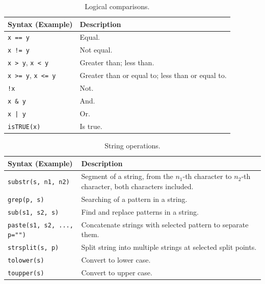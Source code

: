 \begin{table}
  \centering \caption{Logical comparisons.}\label{ch:r1:tab:logicalcomparison}
  \begin{tabularx}{\textwidth}{lX}
    \hline
    Syntax (Example) & Description \\ \hline
    \verb|x == y| & Equal. \\
    \verb|x != y| & Not equal. \\
    \verb|x > y|, \verb|x < y| & Greater than; less than. \\
    \verb|x >= y|, \verb|x <= y| & Greater than or equal to; less than or equal to. \\
    \verb|!x| & Not. \\
    \verb|x & y| & And. \\
    \verb$x | y$ & Or. \\
    \verb|isTRUE(x)| & Is true. \\
    \hline
  \end{tabularx}
\end{table}

\begin{table}
  \centering \caption{String operations.}\label{ch:r1:tab:stringoperation}
  \begin{tabularx}{\textwidth}{lX}
    \hline
    Syntax (Example) & Description \\ \hline
    \verb|substr(s, n1, n2)| & Segment of a string, from the $n_1$-th character to $n_2$-th character, both characters included. \\
    \verb|grep(p, s)| & Searching of a pattern in a string. \\
    \verb|sub(s1, s2, s)| & Find and replace patterns in a string. \\
    \verb|paste(s1, s2, ..., p="")| & Concatenate strings with selected pattern to separate them. \\
    \verb|strsplit(s, p)| & Split string into multiple strings at selected split points. \\
    \verb|tolower(s)| & Convert to lower case. \\
    \verb|toupper(s)| & Convert to upper case. \\
    \hline
  \end{tabularx}
\end{table}

